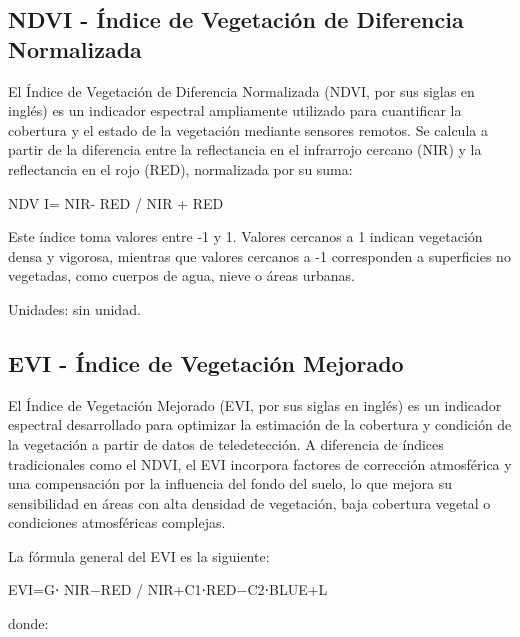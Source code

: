 \documentclass[
]{book}
\begin{document}
\subsection{\texorpdfstring{\textbf{NDVI} - Índice de Vegetación de Diferencia Normalizada}{NDVI - Índice de Vegetación de Diferencia Normalizada}}\label{ndvi---uxedndice-de-vegetaciuxf3n-de-diferencia-normalizada}

El Índice de Vegetación de Diferencia Normalizada (NDVI, por sus siglas en inglés) es un indicador espectral ampliamente utilizado para cuantificar la cobertura y el estado de la vegetación mediante sensores remotos. Se calcula a partir de la diferencia entre la reflectancia en el infrarrojo cercano (NIR) y la reflectancia en el rojo (RED), normalizada por su suma:

NDV I= NIR- RED / NIR + RED

Este índice toma valores entre -1 y 1. Valores cercanos a 1 indican vegetación densa y vigorosa, mientras que valores cercanos a -1 corresponden a superficies no vegetadas, como cuerpos de agua, nieve o áreas urbanas.

Unidades: sin unidad.

\subsection{\texorpdfstring{\textbf{EVI} - Índice de Vegetación Mejorado}{EVI - Índice de Vegetación Mejorado}}\label{evi---uxedndice-de-vegetaciuxf3n-mejorado}

El Índice de Vegetación Mejorado (EVI, por sus siglas en inglés) es un indicador espectral desarrollado para optimizar la estimación de la cobertura y condición de la vegetación a partir de datos de teledetección. A diferencia de índices tradicionales como el NDVI, el EVI incorpora factores de corrección atmosférica y una compensación por la influencia del fondo del suelo, lo que mejora su sensibilidad en áreas con alta densidad de vegetación, baja cobertura vegetal o condiciones atmosféricas complejas.

La fórmula general del EVI es la siguiente:

EVI=G⋅ NIR−RED / NIR+C1\hspace{0pt}⋅RED−C2\hspace{0pt}⋅BLUE+L

donde:
\end{document}
